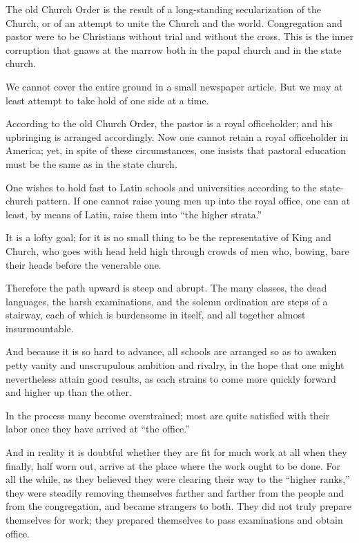 The old Church Order is the result of a long-standing secularization of the Church, or of an attempt to unite the Church and the world. Congregation and pastor were to be Christians without trial and without the cross. This is the inner corruption that gnaws at the marrow both in the papal church and in the state church.

We cannot cover the entire ground in a small newspaper article. But we may at least attempt to take hold of one side at a time.

According to the old Church Order, the pastor is a royal officeholder; and his upbringing is arranged accordingly. Now one cannot retain a royal officeholder in America; yet, in spite of these circumstances, one insists that pastoral education must be the same as in the state church.

One wishes to hold fast to Latin schools and universities according to the state-church pattern. If one cannot raise young men up into the royal office, one can at least, by means of Latin, raise them into “the higher strata.”

It is a lofty goal; for it is no small thing to be the representative of King and Church, who goes with head held high through crowds of men who, bowing, bare their heads before the venerable one.

Therefore the path upward is steep and abrupt. The many classes, the dead languages, the harsh examinations, and the solemn ordination are steps of a stairway, each of which is burdensome in itself, and all together almost insurmountable.

And because it is so hard to advance, all schools are arranged so as to awaken petty vanity and unscrupulous ambition and rivalry, in the hope that one might nevertheless attain good results, as each strains to come more quickly forward and higher up than the other.

In the process many become overstrained; most are quite satisfied with their labor once they have arrived at “the office.”

And in reality it is doubtful whether they are fit for much work at all when they finally, half worn out, arrive at the place where the work ought to be done. For all the while, as they believed they were clearing their way to the “higher ranks,” they were steadily removing themselves farther and farther from the people and from the congregation, and became strangers to both. They did not truly prepare themselves for work; they prepared themselves to pass examinations and obtain office.

